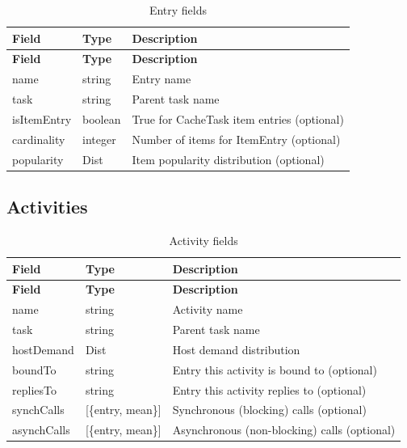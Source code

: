 \begin{footnotesize}
\begin{longtable}{|T{2.2cm}|T{2.5cm}|D{8.2cm}|}
\caption{Entry fields}\label{tab:json-entry}
\\\hline
\textbf{Field} & \textbf{Type} & \textbf{Description} \\\hline
\endfirsthead
\hline \textbf{Field} & \textbf{Type} & \textbf{Description} \\\hline
\endhead
\hline
\endfoot
name        & string  & Entry name \\\hline
task        & string  & Parent task name \\\hline
isItemEntry & boolean & True for CacheTask item entries (optional) \\\hline
cardinality & integer & Number of items for ItemEntry (optional) \\\hline
popularity  & Dist    & Item popularity distribution (optional) \\\hline
\end{longtable}
\end{footnotesize}

\subsection{Activities}
\label{json:lqn-activity}

\begin{footnotesize}
\begin{longtable}{|T{2.2cm}|T{3.5cm}|D{7.2cm}|}
\caption{Activity fields}\label{tab:json-activity}
\\\hline
\textbf{Field} & \textbf{Type} & \textbf{Description} \\\hline
\endfirsthead
\hline \textbf{Field} & \textbf{Type} & \textbf{Description} \\\hline
\endhead
\hline
\endfoot
name       & string & Activity name \\\hline
task       & string & Parent task name \\\hline
hostDemand & Dist   & Host demand distribution \\\hline
boundTo    & string & Entry this activity is bound to (optional) \\\hline
repliesTo  & string & Entry this activity replies to (optional) \\\hline
synchCalls & [\{entry, mean\}] & Synchronous (blocking) calls (optional) \\\hline
asynchCalls & [\{entry, mean\}] & Asynchronous (non-blocking) calls (optional) \\\hline
\end{longtable}
\end{footnotesize}

